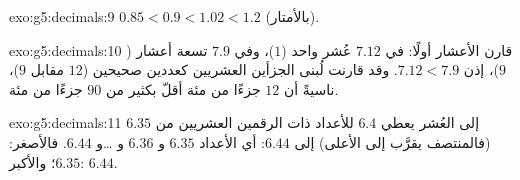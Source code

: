 \begin{solution}{exo:g5:decimals:9}
$0.85 < 0.9 < 1.02 < 1.2$ (بالأمتار).
\end{solution}

\begin{solution}{exo:g5:decimals:10}
قارن الأعشار أولًا: في $7.12$ عُشر واحد ($1$)، وفي $7.9$ تسعة
أعشار ($9$)، إذن $7.12 < 7.9$. وقد قارنت لُبنى الجزأين العشريين
كعددين صحيحين ($12$ مقابل $9$)، ناسيةً أن $12$ جزءًا من مئة أقلّ
بكثير من $90$ جزءًا من مئة.
\end{solution}

\begin{solution}{exo:g5:decimals:11}
 إلى العُشر يعطي $6.4$ للأعداد ذات الرقمين العشريين من
$6.35$ (فالمنتصف يقرَّب إلى الأعلى) إلى $6.44$: أي الأعداد $6.35$ و $6.36$
و \dots و $6.44$. فالأصغر: $6.35$؛ والأكبر: $6.44$.
\end{solution}
